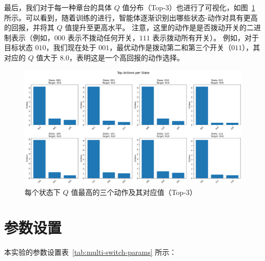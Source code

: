 最后，我们对于每一种章台的具体 \(Q\) 值分布（Top-\(3\)）也进行了可视化，如图~\ref{fig:qvalue_top3} 所示。可以看到，随着训练的进行，智能体逐渐识别出哪些状态-动作对具有更高的回报，并将其 \(Q\) 值提升至更高水平。
注意，这里的动作是是否拨动开关的二进制表示（例如，\(000\) 表示不拨动任何开关，\(111\) 表示拨动所有开关）。
例如，对于目标状态 \(010\)，我们现在处于 \(001\)，最优动作是拨动第二和第三个开关（\(011\)），其对应的 \(Q\) 值大于 \(8.0\)，表明这是一个高回报的动作选择。
\begin{figure}[htbp]
    \centering
    \includegraphics[width=1.0\textwidth]{figure/multi_switch/top_actions_visualization.png}
    \caption{每个状态下 \(Q\) 值最高的三个动作及其对应值（Top-\(3\)）}
    \label{fig:qvalue_top3}
\end{figure}

\section{参数设置}

本实验的参数设置表~\ref{tab:multi-switch-params} 所示：

